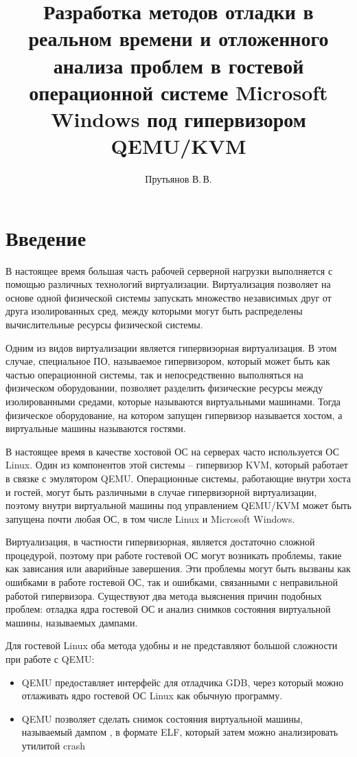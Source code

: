 \documentclass{mipt-thesis-bs}
\title{Разработка методов отладки в реальном времени и отложенного анализа проблем в гостевой операционной системе Microsoft Windows под гипервизором QEMU/KVM}
\author{Прутьянов В.\,В.}
\begin{document}
\titlecontents

\chapter{Введение}

В настоящее время большая часть рабочей серверной нагрузки выполняется с помощью различных технологий виртуализации. Виртуализация позволяет на основе одной физической системы запускать множество независимых друг от друга изолированных сред, между которыми могут быть распределены вычислительные ресурсы физической системы.

Одним из видов виртуализации является гипервизорная виртуализация. В этом случае, специальное ПО, называемое гипервизором, который может быть как частью операционной системы, так и непосредственно выполняться на физическом оборудовании, позволяет разделить физические ресурсы между изолированными средами, которые называются виртуальными машинами. Тогда физическое оборудование, на котором запущен гипервизор называется хостом, а виртуальные машины называются гостями.

В настоящее время в качестве хостовой ОС на серверах часто используется ОС Linux. Один из компонентов этой системы -- гипервизор KVM, который работает в связке с эмулятором QEMU. Операционные системы, работающие внутри хоста и гостей, могут быть различными в случае гипервизорной виртуализации, поэтому внутри виртуальной машины под управлением QEMU/KVM может быть запущена почти любая ОС, в том числе Linux и Microsoft Windows.

Виртуализация, в частности гипервизорная, является достаточно сложной процедурой, поэтому при работе гостевой ОС могут возникать проблемы, такие как зависания или аварийные завершения. Эти проблемы могут быть вызваны как ошибками в работе гостевой ОС, так и ошибками, связанными с неправильной работой гипервизора. Существуют два метода выяснения причин подобных проблем: отладка ядра гостевой ОС и анализ снимков состояния виртуальной машины, называемых дампами.

Для гостевой Linux оба метода удобны и не представляют большой сложности при работе с QEMU:

\begin{itemize}
\item QEMU предоставляет интерфейс для отладчика GDB, через который можно отлаживать ядро гостевой ОС Linux как обычную программу.
\item QEMU позволяет сделать снимок состояния виртуальной машины, называемый дампом , в формате ELF, который затем можно анализировать утилитой crash
\end{itemize}
\end{document}
